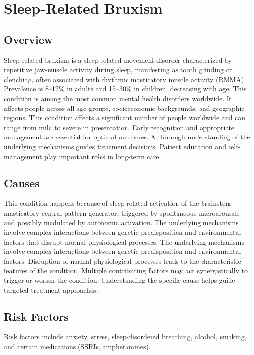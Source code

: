 \chapter{Sleep-Related Bruxism}
\label{sec:Sleep-Related Bruxism}

\section{Overview}
Sleep-related bruxism is a sleep-related movement disorder characterized by repetitive jaw-muscle activity during sleep, manifesting as tooth grinding or clenching, often associated with rhythmic masticatory muscle activity (RMMA). Prevalence is 8--12\% in adults and 15--30\% in children, decreasing with age. This condition is among the most common mental health disorders worldwide. It affects people across all age groups, socioeconomic backgrounds, and geographic regions. This condition affects a significant number of people worldwide and can range from mild to severe in presentation. Early recognition and appropriate management are essential for optimal outcomes. A thorough understanding of the underlying mechanisms guides treatment decisions. Patient education and self-management play important roles in long-term care.
\section{Causes}
This condition happens because of sleep-related activation of the brainstem masticatory central pattern generator, triggered by spontaneous microarousals and possibly modulated by autonomic activation. The underlying mechanisms involve complex interactions between genetic predisposition and environmental factors that disrupt normal physiological processes. The underlying mechanisms involve complex interactions between genetic predisposition and environmental factors. Disruption of normal physiological processes leads to the characteristic features of the condition. Multiple contributing factors may act synergistically to trigger or worsen the condition. Understanding the specific cause helps guide targeted treatment approaches.
\section{Risk Factors}
Risk factors include anxiety, stress, sleep-disordered breathing, alcohol, smoking, and certain medications (SSRIs, amphetamines).

